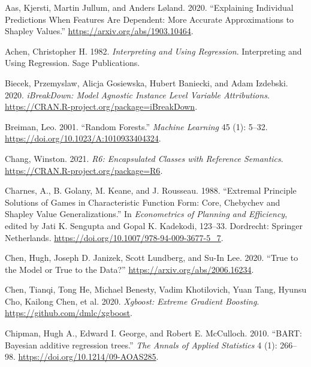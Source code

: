\hypertarget{refs}{}
\begin{CSLReferences}{1}{0}
\leavevmode{}%
Aas, Kjersti, Martin Jullum, and Anders Løland. 2020. {``Explaining Individual Predictions When Features Are Dependent: More Accurate Approximations to Shapley Values.''} \url{https://arxiv.org/abs/1903.10464}.

\leavevmode{}%
Achen, Christopher H. 1982. \emph{Interpreting and Using Regression}. Interpreting and Using Regression. Sage Publications.

\leavevmode{}%
Biecek, Przemyslaw, Alicja Gosiewska, Hubert Baniecki, and Adam Izdebski. 2020. \emph{iBreakDown: Model Agnostic Instance Level Variable Attributions}. \url{https://CRAN.R-project.org/package=iBreakDown}.

\leavevmode{}%
Breiman, Leo. 2001. {``Random Forests.''} \emph{Machine Learning} 45 (1): 5--32. \url{https://doi.org/10.1023/A:1010933404324}.

\leavevmode{}%
Chang, Winston. 2021. \emph{R6: Encapsulated Classes with Reference Semantics}. \url{https://CRAN.R-project.org/package=R6}.

\leavevmode{}%
Charnes, A., B. Golany, M. Keane, and J. Rousseau. 1988. {``Extremal Principle Solutions of Games in Characteristic Function Form: Core, Chebychev and Shapley Value Generalizations.''} In \emph{Econometrics of Planning and Efficiency}, edited by Jati K. Sengupta and Gopal K. Kadekodi, 123--33. Dordrecht: Springer Netherlands. \url{https://doi.org/10.1007/978-94-009-3677-5_7}.

\leavevmode{}%
Chen, Hugh, Joseph D. Janizek, Scott Lundberg, and Su-In Lee. 2020. {``True to the Model or True to the Data?''} \url{https://arxiv.org/abs/2006.16234}.

\leavevmode{}%
Chen, Tianqi, Tong He, Michael Benesty, Vadim Khotilovich, Yuan Tang, Hyunsu Cho, Kailong Chen, et al. 2020. \emph{Xgboost: Extreme Gradient Boosting}. \url{https://github.com/dmlc/xgboost}.

\leavevmode{}%
Chipman, Hugh A., Edward I. George, and Robert E. McCulloch. 2010. {``{BART: Bayesian additive regression trees}.''} \emph{The Annals of Applied Statistics} 4 (1): 266--98. \url{https://doi.org/10.1214/09-AOAS285}.


\end{CSLReferences}
